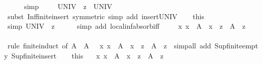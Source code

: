 \begin{isabellebody}
\ \ \ \ \isamarkupfalse%
\ simp\isanewline
\isanewline
\ \ \isamarkupfalse%
\ {\isachardoublequoteopen}{\isasymSqinter}\ UNIV\ {\isacharequal}{\kern0pt}\ z\ {\isasymsqinter}\ {\isasymSqinter}UNIV{\isachardoublequoteclose}\isanewline
\ \ \ \ \isamarkupfalse%
\ {\isacharparenleft}{\kern0pt}subst\ Inf{\isacharunderscore}{\kern0pt}finite{\isacharunderscore}{\kern0pt}insert\ {\isacharbrackleft}{\kern0pt}symmetric{\isacharbrackright}{\kern0pt}{\isacharcomma}{\kern0pt}\ simp\ add{\isacharcolon}{\kern0pt}\ insert{\isacharunderscore}{\kern0pt}UNIV{\isacharparenright}{\kern0pt}\isanewline
\ \ \isamarkupfalse%
\ this\ \isamarkupfalse%
\ {\isacharbrackleft}{\kern0pt}simp{\isacharbrackright}{\kern0pt}{\isacharcolon}{\kern0pt}\ {\isachardoublequoteopen}{\isasymSqinter}UNIV\ {\isasymle}\ z{\isachardoublequoteclose}\isanewline
\ \ \ \ \isamarkupfalse%
\ {\isacharparenleft}{\kern0pt}simp\ add{\isacharcolon}{\kern0pt}\ local{\isachardot}{\kern0pt}inf{\isachardot}{\kern0pt}absorb{\isacharunderscore}{\kern0pt}iff{}{\isacharparenright}{\kern0pt}\isanewline
\ \ \isamarkupfalse%
\ {\isachardoublequoteopen}{\isacharparenleft}{\kern0pt}{\isasymforall}\ x{\isachardot}{\kern0pt}\ x\ {\isasymin}\ A\ {\isasymlongrightarrow}\ x\ {\isasymle}\ z{\isacharparenright}{\kern0pt}\ {\isasymlongrightarrow}\ {\isasymSqunion}A\ {\isasymle}\ z{\isachardoublequoteclose}\isanewline
\ \ \ \ \isamarkupfalse%
\ {\isacharparenleft}{\kern0pt}rule\ finite{\isacharunderscore}{\kern0pt}induct\ {\isacharbrackleft}{\kern0pt}of\ A\ {\isachardoublequoteopen}{\isasymlambda}\ A\ {\isachardot}{\kern0pt}\ {\isacharparenleft}{\kern0pt}{\isasymforall}\ x{\isachardot}{\kern0pt}\ x\ {\isasymin}\ A\ {\isasymlongrightarrow}\ x\ {\isasymle}\ z{\isacharparenright}{\kern0pt}\ {\isasymlongrightarrow}\ {\isasymSqunion}A\ {\isasymle}\ z{\isachardoublequoteclose}\ {\isacharbrackright}{\kern0pt}{\isacharcomma}{\kern0pt}\ simp{\isacharunderscore}{\kern0pt}all\ add{\isacharcolon}{\kern0pt}\ Sup{\isacharunderscore}{\kern0pt}finite{\isacharunderscore}{\kern0pt}empty\ Sup{\isacharunderscore}{\kern0pt}finite{\isacharunderscore}{\kern0pt}insert{\isacharparenright}{\kern0pt}\isanewline
\ \ \isamarkupfalse%
\ this\ \isamarkupfalse%
\ {\isachardoublequoteopen}\ {\isacharparenleft}{\kern0pt}{\isasymAnd}x{\isachardot}{\kern0pt}\ x\ {\isasymin}\ A\ {\isasymLongrightarrow}\ x\ {\isasymle}\ z{\isacharparenright}{\kern0pt}\ {\isasymLongrightarrow}\ {\isasymSqunion}A\ {\isasymle}\ z{\isachardoublequoteclose}\isanewline

\end{isabellebody}
